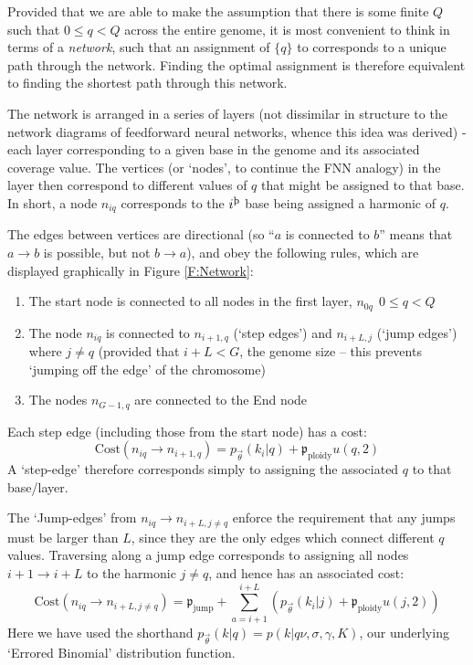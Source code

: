\documentclass[fleqn,usenatbib]{mnras}
\begin{document}

				Provided that we are able to make the assumption that there is some finite $Q$ such that $0 \leq q < Q$ across the entire genome, it is most convenient to think in terms of a \textit{network}, such that an assignment of $\{q\}$ to corresponds to a unique path through the network. Finding the optimal assignment is therefore equivalent to finding the shortest path through this network.

				The network is arranged in a series of layers (not dissimilar in structure to the network diagrams of feedforward neural networks, whence this idea was derived) - each layer corresponding to a given base in the genome and its associated coverage value. The vertices (or `nodes', to continue the FNN analogy) in the layer then correspond to different values of $q$ that might be assigned to that base. In short, a node $n_{iq}$ corresponds to the $i^\text{\th}$ base being assigned a harmonic of $q$.

				The edges between vertices are directional (so ``$a$ is connected to $b$'' means that $a\to b$ is possible, but not $b\to a$), and obey the following rules, which are displayed graphically in Figure \ref{F:Network}:
				\begin{enumerate}
					\item The start node is connected to all nodes in the first layer, $n_{0q}~~ 0 \leq q < Q$ 
					\item The node $n_{iq}$ is connected to $n_{i+1,q}$ (`step edges') and $n_{i+L,j}$ (`jump edges') where $j\neq q$ (provided that $i + L < G$, the genome size -- this prevents `jumping off the edge' of the chromosome)
					\item The nodes $n_{G-1,q}$ are connected to the End node
				\end{enumerate}
				Each step edge (including those from the start node) has a cost:
				\begin{equation}
					\text{Cost}(n_{iq} \to n_{i+1,q}) = p_{\vec{\theta}}(k_i | q) + \mathfrak{p}_\text{ploidy} u(q,2)
				\end{equation}
				A `step-edge' therefore corresponds simply to assigning the associated $q$ to that base/layer.

				The `Jump-edges' from $n_{iq} \to n_{i+L,j\neq q}$ enforce the requirement that any jumps must be larger than $L$, since they are the only edges which connect different $q$ values. Traversing along a jump edge corresponds to assigning all nodes $i+1 \to i+L$ to the harmonic $j\neq q$, and hence has an associated cost:
				\begin{equation}
					\text{Cost}(n_{iq} \to n_{i+L,j\neq q}) = \mathfrak{p}_\text{jump} + \sum_{a = i+1}^{i+L} \left( p_{\vec{\theta}}(k_i | j)+ \mathfrak{p}_\text{ploidy} u(j,2) \right)
				\end{equation}
				Here we have used the shorthand $p_{\vec{\theta}}(k|q) = p(k| q\nu, \sigma,\gamma,K)$, our underlying `Errored Binomial' distribution function.
\end{document}

